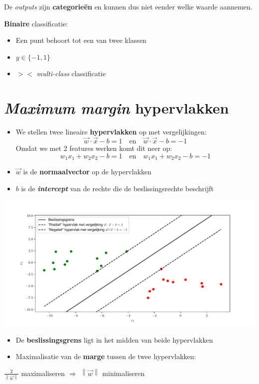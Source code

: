 \documentclass[kulak]{kulakposter}
\newcommand{\norm}[1]{\left\| #1 \right\|}
\begin{document}
\begin{multicols}{2}
\begin{multicols}{2}
		De \textit{outputs} zijn \textbf{categorieën} en kunnen dus niet eender welke waarde aannemen.
		
	\end{multicols}
	
	\vspace{1.5cm}
	\textbf{Binaire} classificatie:
	\begin{itemize}
		\item Een punt behoort tot een van twee klassen
		\item \(y \in \{-1,1\}\)
		\item \(><\) \textit{multi-class} classificatie
	\end{itemize}
	\vfill \null
	
	\columnbreak
	\section{\textit{Maximum margin} hypervlakken}
	\begin{itemize}
		\item We stellen twee lineaire \textbf{hypervlakken} op met vergelijkingen:
			\[\vec{w} \cdot \vec{x} - b = 1 \quad \text{en} \quad \vec{w} \cdot \vec{x} - b = -1\]
			Omdat we met 2 features werken komt dit neer op:
			\[w_1x_1 + w_2x_2 - b = 1 \quad \text{en} \quad w_1x_1 + w_2x_2 - b = -1\]
	\end{itemize}
		\begin{itemize}
			\item \(\vec{w}\) is de \textbf{normaalvector} op de hypervlakken
			\item \(b\) is de \textit{\textbf{intercept}} van de rechte die de beslissingsrechte beschrijft
		\end{itemize}
	\photohere
	\centering
	\includegraphics[width=.6\columnwidth]{hypervlakken}
	\begin{itemize}
		\item De \textbf{beslissingsgrens} ligt in het midden van beide hypervlakken
		\item Maximalisatie van de \textbf{marge} tussen de twee hypervlakken:
	\end{itemize}
	\centering
	\vspace{0.5cm}
	\(\frac{2}{\norm{\vec{w}}}\) maximaliseren \(\Rightarrow\) \(\norm{\vec{w}}\) minimaliseren
	
\end{multicols}
	
\end{document}
